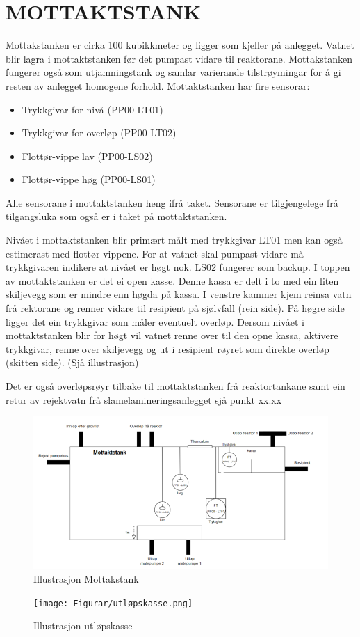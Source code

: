 \newpage
\section{MOTTAKTSTANK}
Mottakstanken er cirka 100 kubikkmeter og ligger som kjeller på anlegget. Vatnet blir lagra i mottaktstanken før det pumpast vidare til reaktorane. 
Mottakstanken fungerer også som utjamningstank og samlar varierande tilstrøymingar for å gi resten av anlegget homogene forhold.
Mottaktstanken har fire sensorar:
\begin{itemize}
    \item Trykkgivar for nivå (PP00-LT01) 
    \item Trykkgivar for overløp (PP00-LT02) 
    \item Flottør-vippe lav (PP00-LS02) 
    \item Flottør-vippe høg (PP00-LS01) 
\end{itemize}
Alle sensorane i mottaktstanken heng ifrå taket. Sensorane er tilgjengelege frå tilgangsluka som også er i taket på mottaktstanken.

Nivået i mottaktstanken blir primært målt med trykkgivar LT01 men kan også estimerast med flottør-vippene. For at vatnet skal pumpast vidare må trykkgivaren indikere at nivået er høgt nok. 
LS02 fungerer som backup.
I toppen av mottaktstanken er det ei open kasse. Denne kassa er delt i to med ein liten skiljevegg som er mindre enn høgda på kassa. I venstre kammer kjem reinsa vatn frå rektorane og renner vidare til resipient på sjølvfall (rein side). 
På høgre side ligger det ein trykkgivar som måler eventuelt overløp. Dersom nivået i mottaktstanken blir for høgt vil vatnet renne over til den opne kassa, 
aktivere trykkgivar, renne over skiljevegg og ut i resipient røyret som direkte overløp (skitten side). (Sjå illustrasjon)

Det er også overløpsrøyr tilbake til mottaktstanken frå reaktortankane samt ein retur av rejektvatn frå slamelamineringsanlegget sjå punkt xx.xx

\newpage
\begin{figure}[htbp]
    \centering
    \includegraphics[width=1\textwidth]{Figurar/Mottakstank.png}
    \caption{Illustrasjon Mottakstank}\label{fig:Mottakstank}
\end{figure}

\begin{figure}[htbp]
    \centering
    \texttt{[image: Figurar/utløpskasse.png]}
    \caption{Illustrasjon utløpskasse}\label{fig:utløpskasse}
\end{figure}


